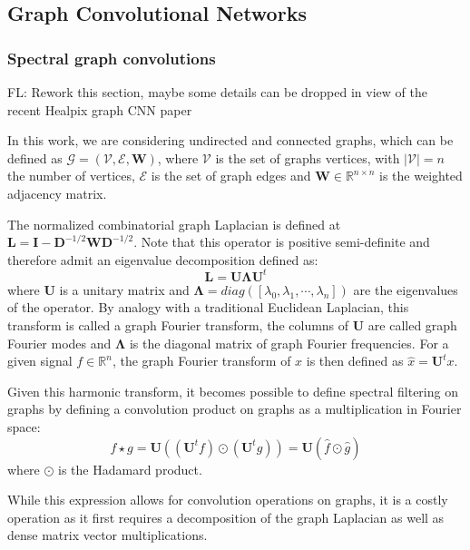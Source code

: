 \documentclass[a4paper,fleqn,usenatbib]{mnras}
\newcommand{\fl}[1]{{\color{magenta}FL: #1}}
\begin{document}
\subsection{Graph Convolutional Networks}

\subsubsection{Spectral graph convolutions}

\fl{Rework this section, maybe some details can be dropped in view of the recent Healpix graph CNN paper}

In this work, we are considering undirected and connected graphs, which can be defined as  $\mathcal{G} = (\mathcal{V} , \mathcal{E}, \mathbf{W})$, where $\mathcal{V}$ is the set of graphs vertices, with $\left\vert \mathcal{V} \right\vert = n$ the number of vertices,  $\mathcal{E}$ is the set of graph edges and $\mathbf{W} \in \mathbb{R}^{n \times  n}$ is the weighted adjacency matrix.

The normalized combinatorial graph  Laplacian is defined at $\mathbf{L} = \mathbf{I} - \mathbf{D}^{-1/2} \mathbf{W} \mathbf{D}^{-1/2}$. Note that this operator is positive semi-definite and therefore  admit an eigenvalue decomposition defined as:
\begin{equation}
	\mathbf{L} = \mathbf{U} \mathbf{\Lambda} \mathbf{U}^t
\end{equation}
where $\mathbf{U}$ is a unitary matrix and $\mathbf{\Lambda} = diag([\lambda_0, \lambda_1, \cdots, \lambda_n])$ are the eigenvalues  of the operator. By analogy with a traditional Euclidean Laplacian, this transform is called a graph Fourier transform, the columns of $\mathbf{U}$ are called graph Fourier modes  and $\mathbf{\Lambda}$ is the diagonal matrix of graph Fourier frequencies. For a given signal $f \in \mathbb{R}^n$, the graph Fourier transform of $x$ is then defined as $\hat{x} = \mathbf{U}^t x$. 

Given this  harmonic transform, it becomes possible to define spectral filtering on graphs by defining a convolution product on graphs as a multiplication in Fourier space:
\begin{equation}
	f  \star g = \mathbf{U} \left( ( \mathbf{U}^t f) \odot  ( \mathbf{U}^t g ) \right) = \mathbf{U} \left(  \hat{f} \odot \hat{g} \right)
\end{equation}
where $\odot$ is the Hadamard product.

While this expression allows for convolution operations  on graphs, it is a costly operation as it first requires a decomposition of the  graph Laplacian as well as dense matrix vector multiplications. 
\end{document}

